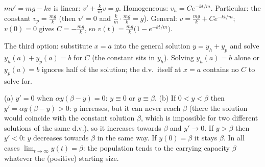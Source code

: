  $mv'=mg-kv$ is linear: $v'+\frac kmv=g$. Homogeneous: $v_h=Ce^{-kt/m}$. Particular: the constant $v_p=\frac{mg}k$ (then $v'=0$ and $\frac km\cdot\frac{mg}k=g$). General: $v=\frac{mg}k+Ce^{-kt/m}$; $v(0)=0$ gives $C=-\frac{mg}k$, so $v(t)=\frac{mg}k\big(1-e^{-kt/m}\big)$.

 The third option: substitute $x=a$ into the general solution $y=y_h+y_p$ and solve $y_h(a)+y_p(a)=b$ for $C$ (the constant sits in $y_h$). Solving $y_h(a)=b$ alone or $y_p(a)=b$ ignores half of the solution; the d.v.\ itself at $x=a$ contains no $C$ to solve for.

 (a) $y'=0$ when $\alpha y(\beta-y)=0$: $y\equiv0$ or $y\equiv\beta$. (b) If $0<y<\beta$ then $y'=\alpha y(\beta-y)>0$: $y$ increases, but it can never reach $\beta$ (there the solution would coincide with the constant solution $\beta$, which is impossible for two different solutions of the same d.v.), so it increases towards $\beta$ and $y'\to0$. If $y>\beta$ then $y'<0$: $y$ decreases towards $\beta$ in the same way. If $y(0)=\beta$ it stays $\beta$. In all cases $\lim_{t\to\infty}y(t)=\beta$: the population tends to the carrying capacity $\beta$ whatever the (positive) starting size.
